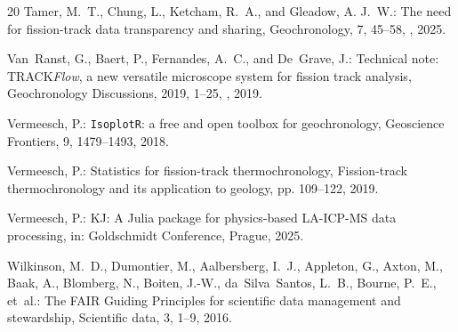 \documentclass[gchron, manuscript]{copernicus}
\begin{document}
\begin{thebibliography}{20}
Tamer, M.~T., Chung, L., Ketcham, R.~A., and Gleadow, A. J.~W.: The need for
  fission-track data transparency and sharing, Geochronology, 7, 45--58,
  , 2025.

Van~Ranst, G., Baert, P., Fernandes, A.~C., and De~Grave, J.: Technical note:
  TRACK\textit{Flow}, a new versatile microscope system for fission track
  analysis, Geochronology Discussions, 2019, 1--25,
  , 2019.

Vermeesch, P.: {\texttt{IsoplotR}: a free and open toolbox for geochronology},
  Geoscience Frontiers, 9, 1479--1493, 2018.

Vermeesch, P.: Statistics for fission-track thermochronology, Fission-track
  thermochronology and its application to geology, pp. 109--122, 2019.

Vermeesch, P.: {KJ: A Julia package for physics-based LA-ICP-MS data
  processing}, in: Goldschmidt Conference, Prague, 2025.

Wilkinson, M.~D., Dumontier, M., Aalbersberg, I.~J., Appleton, G., Axton, M.,
  Baak, A., Blomberg, N., Boiten, J.-W., da~Silva~Santos, L.~B., Bourne, P.~E.,
  et~al.: {The FAIR Guiding Principles for scientific data management and
  stewardship}, Scientific data, 3, 1--9, 2016.

\end{thebibliography}

%
%
\end{document}
